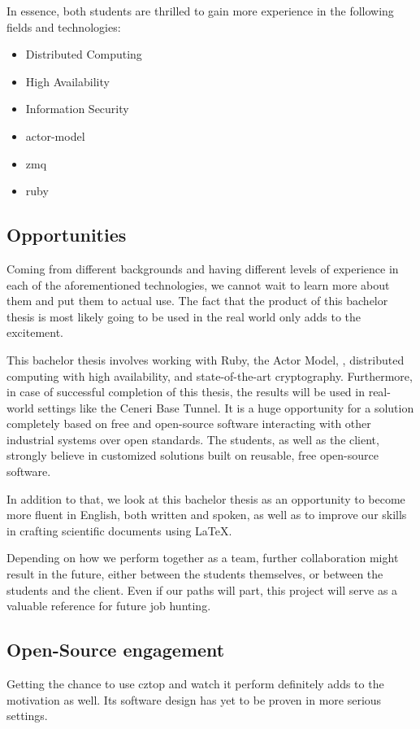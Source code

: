 In essence, both students are thrilled to gain more experience in the following
fields and technologies:

\begin{itemize}
	\item Distributed Computing
	\item High Availability
	\item Information Security
	\item \gls{actor-model}
	\item \gls{zmq}
	\item \gls{ruby}
\end{itemize}

\subsection{Opportunities}
Coming from different backgrounds and having different levels of experience in
each of the aforementioned technologies, we cannot wait to learn more about them and put
them to actual use. The fact that the product of this bachelor thesis is most
likely going to be used in the real world only adds to the excitement.

This bachelor thesis involves working with Ruby, the Actor Model, \zmq,
distributed computing with high availability, and state-of-the-art
cryptography. Furthermore, in case of successful completion of this thesis, the results will be used in real-world settings like the Ceneri
Base Tunnel. It is a huge opportunity for a solution completely based on free
and open-source software interacting with other industrial systems over open standards. The students, as well as the client, strongly believe
in customized solutions built on reusable, free open-source software.

In addition to that, we look at this bachelor thesis as an opportunity to
become more fluent in English, both written and spoken, as well as to improve
our skills in crafting scientific documents using {\LaTeX}.

Depending on how we perform together as a team, further collaboration might
result in the future, either between the students themselves, or between the
students and the client. Even if our paths will part, this project will
serve as a valuable reference for future job hunting.

\subsection{Open-Source engagement}
Getting the chance to use \gls{cztop} and watch it perform definitely adds to
the motivation as well. Its software design has yet to be proven in more
serious settings.


